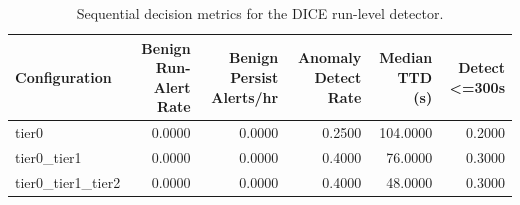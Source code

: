 \begin{table}[t]
\centering
\caption{Sequential decision metrics for the DICE run-level detector.}
\label{tab:dice_sequential_metrics}
\footnotesize
\begin{tabular}{lrrrrr}
\toprule
Configuration & Benign Run-Alert Rate & Benign Persist Alerts/hr & Anomaly Detect Rate & Median TTD (s) & Detect <=300s \\
\midrule
tier0 & 0.0000 & 0.0000 & 0.2500 & 104.0000 & 0.2000 \\
tier0_tier1 & 0.0000 & 0.0000 & 0.4000 & 76.0000 & 0.3000 \\
tier0_tier1_tier2 & 0.0000 & 0.0000 & 0.4000 & 48.0000 & 0.3000 \\
\bottomrule
\end{tabular}

\end{table}
